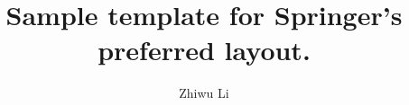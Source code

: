 \documentclass[graybox,envcountchap,sectrefs]{svmono1}
\begin{document}
\author{Zhiwu Li}
\title{ Sample template for Springer's preferred layout. }
\maketitle
\frontmatter%

\tableofcontents


\mainmatter%


\backmatter%

\printindex

\end{document}
